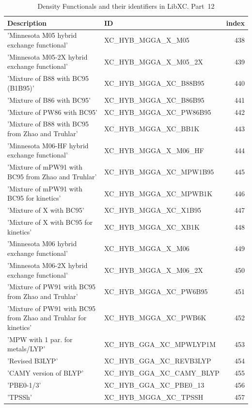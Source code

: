 \documentclass[final,12pt,makeidx,DIV=calc]{article}
\begin{document}
{{{{{{\begin{table}[!h]
\caption{Density Functionals and their identifiers in LibXC. Part~12}
\begin{center}
\begin{tabular}{llr}
\hline
\hline
Description & ID & index\\
\hline
  'Minnesota M05 hybrid exchange functional' & XC\_HYB\_MGGA\_X\_M05  &438\\
  'Minnesota M05-2X hybrid exchange functional' & XC\_HYB\_MGGA\_X\_M05\_2X  &439\\
  'Mixture of B88 with BC95 (B1B95)' & XC\_HYB\_MGGA\_XC\_B88B95  &440\\
  'Mixture of B86 with BC95' & XC\_HYB\_MGGA\_XC\_B86B95  &441\\
  'Mixture of PW86 with BC95' & XC\_HYB\_MGGA\_XC\_PW86B95  &442\\
  'Mixture of B88 with BC95 from Zhao and Truhlar' & XC\_HYB\_MGGA\_XC\_BB1K  &443\\
  'Minnesota M06-HF hybrid exchange functional' & XC\_HYB\_MGGA\_X\_M06\_HF  &444\\
  'Mixture of mPW91 with BC95 from Zhao and Truhlar' & XC\_HYB\_MGGA\_XC\_MPW1B95  &445\\
  'Mixture of mPW91 with BC95 for kinetics' & XC\_HYB\_MGGA\_XC\_MPWB1K  &446\\
  'Mixture of X with BC95' & XC\_HYB\_MGGA\_XC\_X1B95  &447\\
  'Mixture of X with BC95 for kinetics' & XC\_HYB\_MGGA\_XC\_XB1K  &448\\
  'Minnesota M06 hybrid exchange functional' & XC\_HYB\_MGGA\_X\_M06  &449\\
  'Minnesota M06-2X hybrid exchange functional' & XC\_HYB\_MGGA\_X\_M06\_2X  &450\\
  'Mixture of PW91 with BC95 from Zhao and Truhlar' & XC\_HYB\_MGGA\_XC\_PW6B95  &451\\
  'Mixture of PW91 with BC95 from Zhao and Truhlar for kinetics' & XC\_HYB\_MGGA\_XC\_PWB6K  &452\\
  'MPW with 1 par. for metals/LYP' & XC\_HYB\_GGA\_XC\_MPWLYP1M  &453\\
  'Revised B3LYP' & XC\_HYB\_GGA\_XC\_REVB3LYP  &454\\
  'CAMY version of BLYP' & XC\_HYB\_GGA\_XC\_CAMY\_BLYP  &455\\
  'PBE0-1/3' & XC\_HYB\_GGA\_XC\_PBE0\_13  &456\\
  'TPSSh' & XC\_HYB\_MGGA\_XC\_TPSSH  &457\\

\end{tabular}
\end{center}
\end{table}}}}}}}
\end{document}
